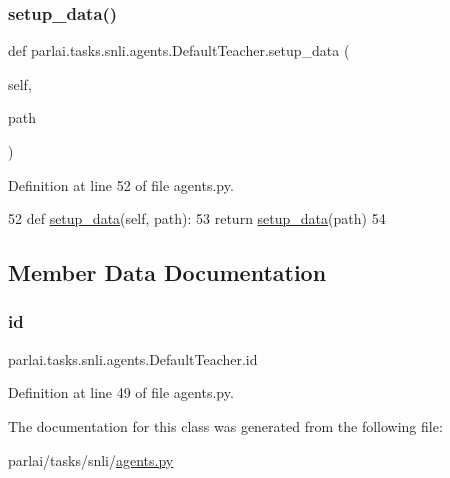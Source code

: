 \subsubsection{\texorpdfstring{setup\+\_\+data()}{setup\_data()}}
{\footnotesize\ttfamily def parlai.\+tasks.\+snli.\+agents.\+Default\+Teacher.\+setup\+\_\+data (\begin{DoxyParamCaption}\item[{}]{self,  }\item[{}]{path }\end{DoxyParamCaption})}



Definition at line 52 of file agents.\+py.


\begin{DoxyCode}
52     \textcolor{keyword}{def }\hyperlink{namespaceparlai_1_1tasks_1_1multinli_1_1agents_a4fa2cb0ba1ed745336ad8bceed36b841}{setup\_data}(self, path):
53         \textcolor{keywordflow}{return} \hyperlink{namespaceparlai_1_1tasks_1_1multinli_1_1agents_a4fa2cb0ba1ed745336ad8bceed36b841}{setup\_data}(path)
54 
\end{DoxyCode}


\subsection{Member Data Documentation}
\mbox{\label{classparlai_1_1tasks_1_1snli_1_1agents_1_1DefaultTeacher_a53a712ad89d4c98e7501d2b307a6481c}} 
\subsubsection{\texorpdfstring{id}{id}}
{\footnotesize\ttfamily parlai.\+tasks.\+snli.\+agents.\+Default\+Teacher.\+id}



Definition at line 49 of file agents.\+py.



The documentation for this class was generated from the following file\+:\begin{DoxyCompactItemize}
\item 
parlai/tasks/snli/\hyperlink{parlai_2tasks_2snli_2agents_8py}{agents.\+py}\end{DoxyCompactItemize}
